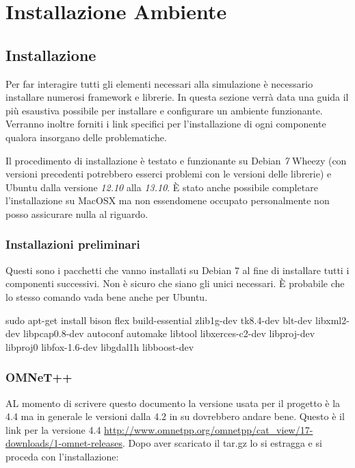 \chapter{Installazione Ambiente}

\section{Installazione}

Per far interagire tutti gli elementi necessari alla simulazione è necessario installare numerosi framework e librerie. In questa sezione verrà data una guida il più esaustiva possibile per installare e configurare un ambiente funzionante. Verranno inoltre forniti i link specifici per l'installazione di ogni componente qualora insorgano delle problematiche.

Il procedimento di installazione è testato e funzionante su Debian \emph{7} Wheezy (con versioni precedenti potrebbero esserci problemi con le versioni delle librerie) e Ubuntu dalla versione \emph{12.10} alla \emph{13.10}. È stato anche possibile completare l'installazione su MacOSX ma non essendomene occupato personalmente non posso assicurare nulla al riguardo.

\subsection{Installazioni preliminari}

Questi sono i pacchetti che vanno installati su Debian 7 al fine di installare tutti i componenti successivi. Non è sicuro che siano gli unici necessari. È probabile che lo stesso comando vada bene anche per Ubuntu.

\begin{bash}
sudo apt-get install bison flex build-essential zlib1g-dev tk8.4-dev blt-dev libxml2-dev libpcap0.8-dev autoconf automake libtool libxerces-c2-dev libproj-dev libproj0 libfox-1.6-dev libgdal1h libboost-dev
\end{bash}

\subsection{OMNeT++} 

AL momento di scrivere questo documento la versione usata per il progetto è la 4.4 ma in generale le versioni dalla 4.2 in su dovrebbero andare bene. Questo è il link per la versione 4.4 \url{http://www.omnetpp.org/omnetpp/cat_view/17-downloads/1-omnet-releases}. Dopo aver scaricato il tar.gz lo si estragga e si proceda con l'installazione:

